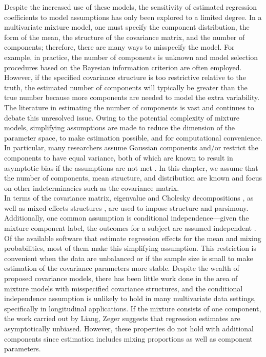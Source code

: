 \documentclass[10pt]{article}
\begin{document}
 Despite the increased use of these models, the sensitivity of estimated regression coefficients to model assumptions has only been explored to a limited degree. In a multivariate mixture model, one must specify the component distribution, the form of the mean, the structure of the covariance matrix, and the number of components; therefore, there are many ways to misspecify the model. For example, in practice, the number of components is unknown and model selection procedures based on the Bayesian information criterion are often employed. However, if the specified covariance structure is too restrictive relative to the truth, the estimated number of components will typically be greater than the true number because more components are needed to model the extra variability. The literature in estimating the number of components is  vast \cite{oliveira2005} and continues to debate this unresolved issue. Owing to the potential complexity of mixture models, simplifying assumptions are made to reduce the dimension of the parameter space, to make estimation possible, and for computational convenience. In particular, many researchers assume Gaussian components and/or restrict the components to have equal variance, both of which are known to result in asymptotic bias if the assumptions are not met \cite{gray1994, lo2011}. In this chapter, we assume that the number of components, mean structure, and distribution are known and focus on other indeterminacies such as the covariance matrix.\\
 
In terms of the covariance matrix, eigenvalue and Cholesky decompositions \cite{banfield1993,mcnicholas2010}, as well as mixed effects structures \cite{muthen1999}, are used to impose structure and parsimony. Additionally, one common assumption is conditional independence---given the mixture component label, the outcomes for a subject are assumed independent \cite{ostbye2011,muthen2008}. Of the available software that estimate regression effects for the mean and mixing probabilities, most of them make this simplifying assumption. This restriction is convenient when the data are unbalanced or if the sample size is small to make estimation of the covariance parameters more stable. Despite the wealth of proposed covariance models, there has been little work done in the area of mixture models with misspecified covariance structures, and the conditional independence assumption is unlikely to hold in many multivariate data settings, specifically in longitudinal applications. If the mixture consists of one component, the work carried out by Liang, Zeger \cite{liang1986} suggests that regression estimates are asymptotically unbiased. However, these properties do not hold with additional components since estimation includes mixing proportions as well as component parameters. \\
\end{document}
